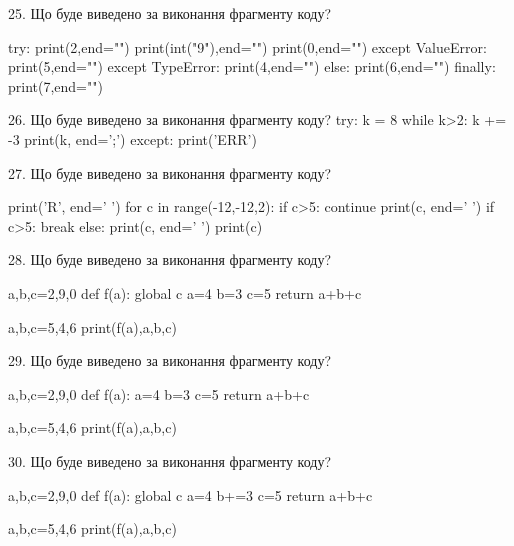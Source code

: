 \documentclass[11pt]{article}
\begin{document}
25. Що буде виведено за виконання фрагменту коду?

try:
    print(2,end="")
    print(int("9"),end="")
    print(0,end="")
except ValueError: print(5,end="")
except TypeError: print(4,end="")
else: print(6,end="")
finally: print(7,end="")


26. Що буде виведено за виконання фрагменту коду?
try:
    k = 8
    while k>2:
        k += -3
    print(k, end=';')
except:
    print('ERR')

27. Що буде виведено за виконання фрагменту коду?

print('R', end=' ')
for c in range(-12,-12,2):
    if c>5:
        continue
        print(c, end=' ')
    if c>5:
        break
    else:
        print(c, end=' ')
    print(c)

28. Що буде виведено за виконання фрагменту коду?

a,b,c=2,9,0
def f(a):
global c    a=4
    b=3
    c=5
    return a+b+c

a,b,c=5,4,6
print(f(a),a,b,c)

29. Що буде виведено за виконання фрагменту коду?

a,b,c=2,9,0
def f(a):
    a=4
    b=3
    c=5
    return a+b+c

a,b,c=5,4,6
print(f(a),a,b,c)

30. Що буде виведено за виконання фрагменту коду?

a,b,c=2,9,0
def f(a):
global c    a=4
    b+=3
    c=5
    return a+b+c

a,b,c=5,4,6
print(f(a),a,b,c)































\newpage
\end{document}
